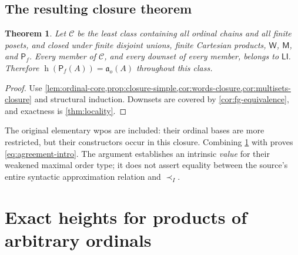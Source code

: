\documentclass[11pt,letterpaper]{article}
\theoremstyle{teal}
\newtheorem{theorem}{Theorem}[section]
\theoremstyle{definition}
\newcommand{\Pf}{\mathsf P_{\!f}}
\newcommand{\hgt}{\operatorname{h}}
\newcommand{\ao}{\mathfrak a_o}
\newcommand{\W}{\mathsf W}
\newcommand{\M}{\mathsf M}
\newcommand{\LI}{\mathsf{LI}}
\begin{document}
\subsection{The resulting closure theorem}
\begin{theorem}\label{thm:closure}
Let $\mathcal C$ be the least class containing all ordinal chains and all finite posets, and closed under finite disjoint unions, finite Cartesian products, $\W$, $\M$, and $\Pf$. Every member of $\mathcal C$, and every downset of every member, belongs to $\LI$. Therefore $\hgt(\Pf(A))=\ao(A)$ throughout this class.
\end{theorem}
\begin{proof}
Use \cref{lem:ordinal-core,prop:closure-simple,cor:words-closure,cor:multisets-closure} and structural induction. Downsets are covered by \cref{cor:fg-equivalence}, and exactness is \cref{thm:locality}.
\end{proof}

The original elementary wpos are included: their ordinal bases are more restricted, but their constructors occur in this closure. Combining \cref{thm:closure} with \cite[Theorem~5.10]{AHLLSSV} proves \eqref{eq:agreement-intro}. The argument establishes an intrinsic \emph{value} for their weakened maximal order type; it does not assert equality between the source's entire syntactic approximation relation and $\prec_I$.

\section{Exact heights for products of arbitrary ordinals}
\end{document}
